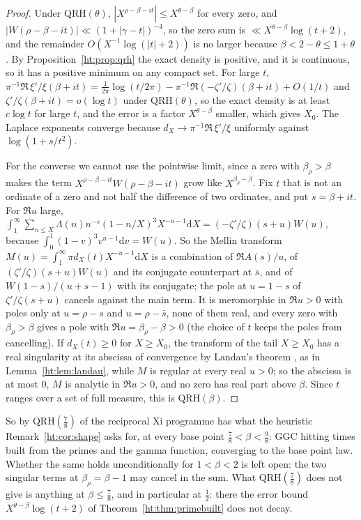 \begin{proof}
Under $\mathrm{QRH}(\theta)$, $|X^{\rho-\beta-it}|\le X^{\theta-\beta}$ for every zero, and $|W(\rho-\beta-it)|\ll(1+|\gamma-t|)^{-4}$, so the zero sum is $\ll X^{\theta-\beta}\log(t+2)$, and the remainder $O(X^{-1}\log(|t|+2))$ is no larger because $\beta<2-\theta\le1+\theta$. By Proposition~\ref{ht:prop:qrh} the exact density is positive, and it is continuous, so it has a positive minimum on any compact set. For large $t$, $\pi^{-1}\Re\,\xi'/\xi(\beta+it)=\frac1{2\pi}\log(t/2\pi)-\pi^{-1}\Re(-\zeta'/\zeta)(\beta+it)+O(1/t)$ and $\zeta'/\zeta(\beta+it)=o(\log t)$ under $\mathrm{QRH}(\theta)$, %
so the exact density is at least $c\log t$ for large $t$, and the error is a factor $X^{\theta-\beta}$ smaller, which gives $X_0$. The Laplace exponents converge because $d_X\to\pi^{-1}\Re\,\xi'/\xi$ uniformly against $\log(1+s/t^2)$.

For the converse we cannot use the pointwise limit, since a zero with $\beta_\rho>\beta$ makes the term $X^{\rho-\beta-it}W(\rho-\beta-it)$ grow like $X^{\beta_\rho-\beta}$. Fix $t$ that is not an ordinate of a zero and not half the difference of two ordinates, and put $s=\beta+it$. For $\Re u$ large, $\int_1^\infty\sum_{n\le X}\Lambda(n)n^{-s}(1-n/X)^3X^{-u-1}\mathrm dX=(-\zeta'/\zeta)(s+u)W(u)$, because $\int_0^1(1-v)^3v^{u-1}\mathrm dv=W(u)$. So the Mellin transform $M(u)=\int_1^\infty\pi d_X(t)X^{-u-1}\mathrm dX$ is a combination of $\Re A(s)/u$, of $(\zeta'/\zeta)(s+u)W(u)$ and its conjugate counterpart at $\bar s$, and of $W(1-s)/(u+s-1)$ with its conjugate; the pole at $u=1-s$ of $\zeta'/\zeta(s+u)$ cancels against the main term. It is meromorphic in $\Re u>0$ with poles only at $u=\rho-s$ and $u=\rho-\bar s$, none of them real, and every zero with $\beta_\rho>\beta$ gives a pole with $\Re u=\beta_\rho-\beta>0$ (the choice of $t$ keeps the poles from cancelling). If $d_X(t)\ge0$ for $X\ge X_0$, the transform of the tail $X\ge X_0$ has a real singularity at its abscissa of convergence by Landau's theorem \cite{Widder41}, as in Lemma~\ref{ht:lem:landau}, while $M$ is regular at every real $u>0$; so the abscissa is at most $0$, $M$ is analytic in $\Re u>0$, and no zero has real part above $\beta$. Since $t$ ranges over a set of full measure, this is $\mathrm{QRH}(\beta)$.
\end{proof}

So by $\mathrm{QRH}(\frac78)$ of \cite{OAI26a} the reciprocal Xi programme has what the heuristic Remark~\ref{ht:cor:shape} asks for, at every base point $\frac78<\beta<\frac98$: GGC hitting times built from the primes and the gamma function, converging to the base point law. Whether the same holds unconditionally for $1<\beta<2$ is left open: the two singular terms at $\beta_\rho=\beta-1$ may cancel in the sum. What $\mathrm{QRH}(\frac78)$ does not give is anything at $\beta\le\frac78$, and in particular at $\frac12$: there the error bound $X^{\theta-\beta}\log(t+2)$ of Theorem~\ref{ht:thm:primebuilt} does not decay.


